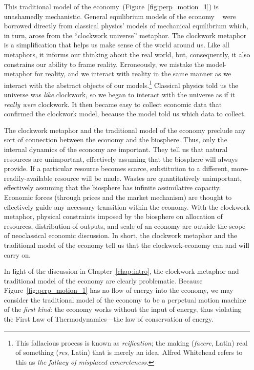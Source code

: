This traditional model of the economy~(Figure~\ref{fig:perp_motion_1}) 
is unashamedly mechanistic.
General equilibrium models of the economy
~\cite{Walras1892, Walras1993}
were borrowed directly from classical physics' models of 
mechanical equilibrium which, in turn, arose from the 
``clockwork universe'' metaphor.\cite{Ingrao1990}
The clockwork metaphor is a simplification 
that helps us make sense of the world around us.
Like all metaphors, it informs our thinking about the real world,
but, consequently,
it also constrains our ability to frame reality.
Erroneously, we mistake the model-metaphor for reality, and
we interact with reality in the same manner 
as we interact with the abstract objects of our
models.\footnote{This fallacious process is known as
	\emph{reification}; the making (\emph{facere}, Latin) real of
	something (\emph{res}, Latin) that is merely an idea.
	Alfred Whitehead refers to this as
	\emph{the fallacy of misplaced concreteness}.\cite{Whitehead2011}
	}
Classical physics told us the universe was
\emph{like} clockwork, 
so we began to interact with the universe
as if it \emph{really were} clockwork.
It then became easy to collect economic data that confirmed the clockwork model,
because the model told us which data to collect.

The clockwork metaphor and the traditional model of the economy
preclude any sort of connection 
between the economy and the biosphere.
Thus, only the internal dynamics of the economy are important. 
They tell us that natural resources are unimportant, 
effectively assuming that the biosphere will always provide.
If a particular resource becomes scarce, 
substitution to a different, more-readily-available resource will be made.
Wastes are quantitatively unimportant, 
effectively assuming that the biosphere has infinite assimilative capacity.
Economic forces (through prices and the market mechanism) 
are thought to effectively guide any necessary transition
within the economy.
With the clockwork metaphor, physical constraints 
imposed by the biosphere 
on allocation of resources, distribution of outputs, and 
scale of an economy 
are outside the scope of neoclassical economic discussion.\cite{Daly1995}
In short, the clockwork metaphor and the traditional model of the economy 
tell us that the clockwork-economy can and will carry on.

In light of the discussion in Chapter~\ref{chap:intro},
the clockwork metaphor and traditional model of the economy
are clearly problematic.
Because Figure~\ref{fig:perp_motion_1} has no flow of energy
into the economy,
we may consider the traditional model of the economy 
to be a perpetual motion machine of the \emph{first kind}:
the economy works without the input of energy, thus violating
the First Law of Thermodynamics---the 
law of conservation of energy.\cite{Rao2004}


